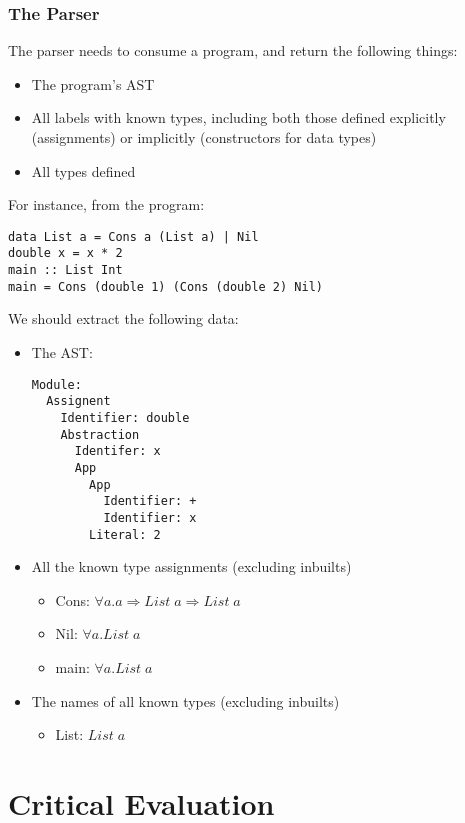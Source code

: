 \documentclass[
author={Kiran Sturt},
degree={BSc},
title={Implementing a Step by Step Evaluator for a Simple Functional Programming language},
unit={COMS30045},]{dissertation}
\theoremstyle{definition}
\theoremstyle{break}
\theoremstyle{definition}
\begin{document}
\subsection{The Parser}
The parser needs to consume a program, and return the following things:
\begin{itemize}
    \item The program's AST
    \item All labels with known types, including both those defined explicitly (assignments) or implicitly (constructors for data types)
    \item All types defined
\end{itemize}
For instance, from the program:
\begin{lstlisting}[]
data List a = Cons a (List a) | Nil
double x = x * 2	
main :: List Int
main = Cons (double 1) (Cons (double 2) Nil)
\end{lstlisting}
We should extract the following data:
\begin{itemize}
    \item The AST: {\filbreak
    \begin{lstlisting}[]
Module:
  Assignent
    Identifier: double
    Abstraction
      Identifer: x
      App
        App
          Identifier: +
          Identifier: x
        Literal: 2
    \end{lstlisting}}
    \item All the known type assignments (excluding inbuilts)
        \begin{itemize}
            \item Cons: \(\forall a. a \Rightarrow List\;a\Rightarrow List\;a\)
            \item Nil: \(\forall a. List\;a\)
            \item main: \(\forall a. List\;a\)
        \end{itemize}
    \item The names of all known types (excluding inbuilts) 
        \begin{itemize}
            \item List: \(List\;a\)
        \end{itemize}
\end{itemize}



\chapter{Critical Evaluation}
\label{chap:evaluation}
\end{document}
